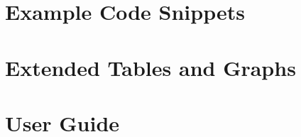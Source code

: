 \documentclass[a4paper,12pt]{article}
\begin{document}
\newpage
\appendix
\section{Example Code Snippets}











\section{Extended Tables and Graphs}
\section{User Guide}


\end{document}
